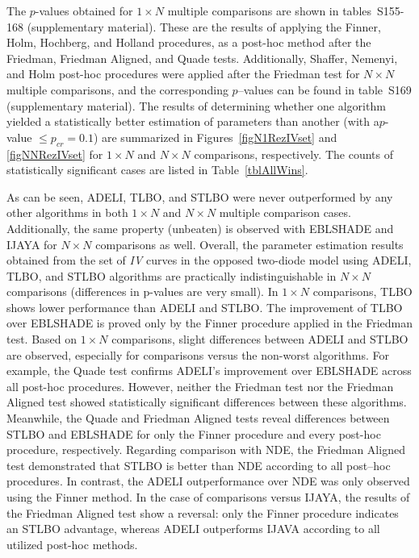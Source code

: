 \documentclass[a4paper,fleqn]{cas-sc}
\begin{document}
The $p$-values obtained for $1\times N$ multiple comparisons are shown in tables~S155-168 (supplementary material).
These are the results of applying  the Finner, Holm, Hochberg, and Holland procedures,
as a post-hoc method after the Friedman, Friedman Aligned, and Quade tests.
Additionally, Shaffer, Nemenyi, and Holm post-hoc procedures were applied
after the Friedman test for $N\times N$ multiple comparisons,
and the corresponding $p$--values can be found in table~S169 (supplementary material).
The results of determining whether one algorithm yielded a statistically better
estimation of parameters than another (with a$p$-value $\leq p_{cr}=0.1$)
are summarized in Figures~\ref{figN1RezIVset} and \ref{figNNRezIVset}
for $1\times N$ and $N\times N$ comparisons, respectively.
The counts of statistically significant cases are listed in Table~\ref{tblAllWins}.

As can be seen, ADELI, TLBO, and STLBO were never outperformed by any other algorithms
in both  $1\times N$ and $N\times N$ multiple comparison cases.
Additionally, the same property (unbeaten) is observed with EBLSHADE and IJAYA for $N\times N$ comparisons as well.
Overall, the parameter estimation results obtained from the set of \emph{IV} curves
in the opposed two-diode model using ADELI, TLBO, and STLBO algorithms
are practically indistinguishable in $N\times N$  comparisons
(differences in p-values are very small).
In $1\times N$ comparisons, TLBO shows lower performance than ADELI and STLBO.
The improvement of TLBO over EBLSHADE is proved only by the Finner procedure applied in the Friedman test.
Based on $1\times N$ comparisons, slight differences between
ADELI and STLBO are observed, especially for comparisons versus the non-worst algorithms.
For example, the Quade test confirms ADELI's improvement
over EBLSHADE across all post-hoc procedures.
However, neither the Friedman test nor the Friedman Aligned test showed
statistically significant differences between these algorithms.
Meanwhile, the Quade and  Friedman Aligned tests reveal differences between STLBO and EBLSHADE
for only the Finner procedure and every post-hoc procedure, respectively.
Regarding comparison with NDE, the Friedman Aligned test demonstrated
that STLBO is better than NDE according to all post--hoc procedures.
In contrast, the ADELI outperformance over NDE was only observed using the Finner method.
In the case of comparisons versus IJAYA,
the results of the Friedman Aligned test show a reversal:
only the Finner procedure indicates an STLBO advantage,
whereas ADELI outperforms IJAVA according to all utilized post-hoc methods.
\end{document}

